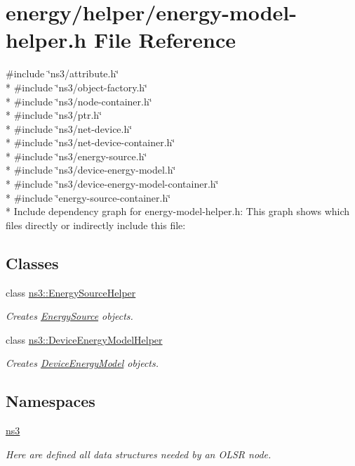 \hypertarget{energy-model-helper_8h}{}\section{energy/helper/energy-\/model-\/helper.h File Reference}
\label{energy-model-helper_8h}
{\ttfamily \#include \char`\"{}ns3/attribute.\+h\char`\"{}}\\*
{\ttfamily \#include \char`\"{}ns3/object-\/factory.\+h\char`\"{}}\\*
{\ttfamily \#include \char`\"{}ns3/node-\/container.\+h\char`\"{}}\\*
{\ttfamily \#include \char`\"{}ns3/ptr.\+h\char`\"{}}\\*
{\ttfamily \#include \char`\"{}ns3/net-\/device.\+h\char`\"{}}\\*
{\ttfamily \#include \char`\"{}ns3/net-\/device-\/container.\+h\char`\"{}}\\*
{\ttfamily \#include \char`\"{}ns3/energy-\/source.\+h\char`\"{}}\\*
{\ttfamily \#include \char`\"{}ns3/device-\/energy-\/model.\+h\char`\"{}}\\*
{\ttfamily \#include \char`\"{}ns3/device-\/energy-\/model-\/container.\+h\char`\"{}}\\*
{\ttfamily \#include \char`\"{}energy-\/source-\/container.\+h\char`\"{}}\\*
Include dependency graph for energy-\/model-\/helper.h\+:
This graph shows which files directly or indirectly include this file\+:
\subsection*{Classes}
\begin{DoxyCompactItemize}
\item 
class \hyperlink{classns3_1_1EnergySourceHelper}{ns3\+::\+Energy\+Source\+Helper}
\begin{DoxyCompactList}\small\item\em Creates \hyperlink{classns3_1_1EnergySource}{Energy\+Source} objects. \end{DoxyCompactList}\item 
class \hyperlink{classns3_1_1DeviceEnergyModelHelper}{ns3\+::\+Device\+Energy\+Model\+Helper}
\begin{DoxyCompactList}\small\item\em Creates \hyperlink{classns3_1_1DeviceEnergyModel}{Device\+Energy\+Model} objects. \end{DoxyCompactList}\end{DoxyCompactItemize}
\subsection*{Namespaces}
\begin{DoxyCompactItemize}
\item 
 \hyperlink{namespacens3}{ns3}
\begin{DoxyCompactList}\small\item\em Here are defined all data structures needed by an O\+L\+SR node. \end{DoxyCompactList}\end{DoxyCompactItemize}
